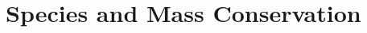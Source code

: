 \documentclass[12pt]{report}
\newcommand{\ATGSIMPLEDIR}{Simple_TGA}  %
\newcommand{\DEFDIR}{Deformation}        %
\newcommand{\DRYINGDIR}{Drying}       %
\newcommand{\MIXDIR}{Mixture_Law}   %
\newcommand{\TEMPDEPDIR}{T_Dependant_Variables}       %
\newcommand{\OXYDIR}{Oxydation}   %
\newcommand{\RXNHDIR}{Reaction_Enthalpy}   %
\begin{document}
\fi

\graphicspath{
  {\ATGSIMPLEDIR/}
  {\ATGPVCDIR/}
  {\DEFDIR/}
  {\DRYINGDIR/}
  {\MIXDIR/}
  {\TEMPDEPDIR/}
  {\OXYDIR/}
  {\RXNHDIR/}
}


\chapter{Species and Mass Conservation}

\newpage


\newpage



\newpage


\newpage


\newpage


\newpage


\newpage


\ifdefined\SpecsCons
\newpage
\appendix
\renewcommand{\thesection}{Appendix~\Alph{section}}

\end{document}
